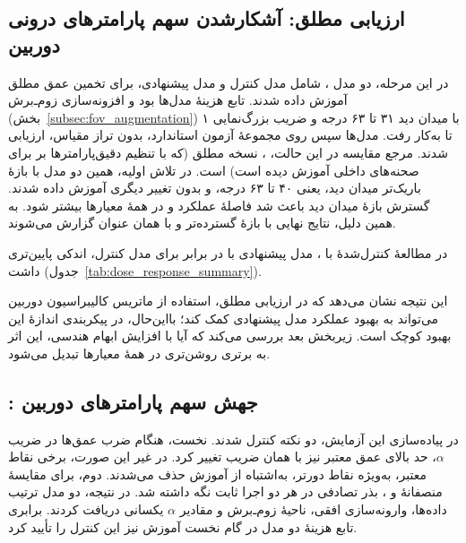 \subsection{ارزیابی مطلق: آشکارشدن سهم پارامترهای درونی دوربین}
\label{subsec:absolute_protocol_results}

در این مرحله، دو مدل ، شامل مدل کنترل و مدل پیشنهادی، برای تخمین عمق مطلق آموزش داده شدند. تابع هزینهٔ مدل‌ها  بود و افزونه‌سازی زوم‌ـ‌برش (بخش~\ref{subsec:fov_augmentation}) با میدان دید ۳۱ تا ۶۳ درجه و ضریب بزرگ‌نمایی ۱ تا  به‌کار رفت. مدل‌ها سپس روی مجموعهٔ آزمون استاندارد، بدون تراز مقیاس، ارزیابی شدند. مرجع مقایسه در این حالت، \publishedbasemodel{}، نسخه مطلق (که با تنظیم دقیق‌پارامترها بر  برای صحنه‌های داخلی آموزش دیده است) است. در تلاش اولیه، همین دو مدل با بازهٔ باریک‌تر میدان دید، یعنی ۴۰ تا ۶۳ درجه، و بدون تغییر دیگری آموزش داده شدند. گسترش بازهٔ میدان دید باعث شد فاصلهٔ عملکرد \proposedmodel{} و \controlmodel{} در همهٔ معیارها بیشتر شود. به همین دلیل، نتایج نهایی با بازهٔ گسترده‌تر و با همان عنوان گزارش می‌شوند.

در مطالعهٔ کنترل‌شدهٔ  با \zoomcropconfig{}، مدل پیشنهادی با  در برابر  برای مدل کنترل،  اندکی پایین‌تری داشت (جدول~\ref{tab:dose_response_summary}).

این نتیجه نشان می‌دهد که در ارزیابی مطلق، استفاده از ماتریس کالیبراسیون دوربین می‌تواند به بهبود عملکرد مدل پیشنهادی کمک کند؛ بااین‌حال، در پیکربندی \zoomcropconfig{} اندازهٔ این بهبود کوچک است. زیربخش بعد بررسی می‌کند که آیا با افزایش ابهام هندسی، این اثر به برتری روشن‌تری در همهٔ معیارها تبدیل می‌شود.

\subsection{\focaljitterconfig{}: جهش سهم پارامترهای دوربین}
\label{subsec:focal_jitter_results}

در پیاده‌سازی این آزمایش، دو نکته کنترل شدند. نخست، هنگام ضرب عمق‌ها در ضریب $\alpha$، حد بالای عمق معتبر نیز با همان ضریب تغییر کرد. در غیر این صورت، برخی نقاط معتبر، به‌ویژه نقاط دورتر، به‌اشتباه از آموزش حذف می‌شدند. دوم، برای مقایسهٔ منصفانهٔ \proposedmodel{} و \controlmodel{}، بذر تصادفی در هر دو اجرا ثابت نگه داشته شد. در نتیجه، دو مدل ترتیب داده‌ها، وارونه‌سازی افقی، ناحیهٔ زوم‌ـ‌برش و مقادیر $\alpha$ یکسانی دریافت کردند. برابری تابع هزینهٔ دو مدل در گام نخست آموزش نیز این کنترل را تأیید کرد.

